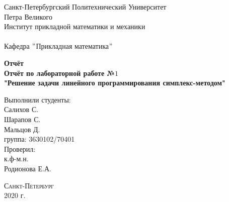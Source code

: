 \documentclass[a4]{article}
\begin{document}
	\def\contentsname{\LARGE{Содержание}}
	\thispagestyle{empty}
	\begin{center} 
		\vspace{2cm} 
		{\Large \sc Санкт-Петербургский Политехнический Университет}\\
		\vspace{2mm}
		{\Large\sc Петра Великого}\\
		\vspace{1cm}
		{\large \sc Институт прикладной математики и механики\\ 
			\vspace{0.5mm}
			\textsc{}}\\ 
		\vspace{0.5mm}
		{\large\sc Кафедра $"$Прикладная математика$"$}\\
		\vspace{15mm}
		
		
		{\sc \textbf{Отчёт\\
			Отчёт по лабораторной работе №$1$\\
			"Решение задачи линейного программирования симплекс-методом"}
			\vspace{6mm}
			
		}
		\vspace*{2mm}
		
		
		\begin{flushleft}
			\vspace{4cm}
			\sc Выполнили студенты:\\
			\sc Салихов С.\\
			\sc Шарапов С.\\
			\sc Мальцов Д.\\
			\sc группа: 3630102/70401\\
			\vspace{1cm}
			\sc Проверил:\\
			\sc к.ф-м.н.\\
			\sc Родионова Е.А.
			\vspace{20mm}
		\end{flushleft}
	\end{center} 
	\begin{center}
		\vfill {\large\textsc{Санкт-Петербург}}\\ 
		2020 г.
	\end{center}
	
	\newpage
	\tableofcontents
	\newpage
	
	
\end{document}
